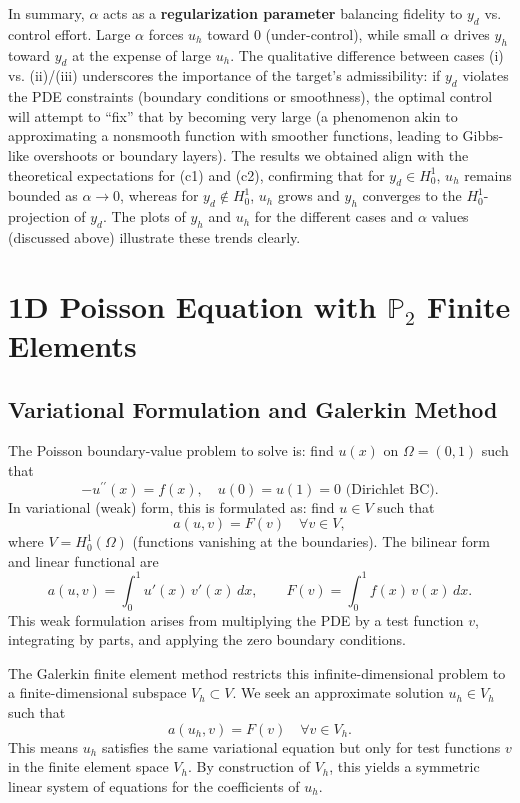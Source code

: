 \documentclass[a4paper,10pt]{report}
\begin{document}
In summary, \(\alpha\) acts as a \textbf{regularization parameter} balancing fidelity to \(y_d\) vs. control effort.
Large \(\alpha\) forces \(u_h\) toward 0 (under-control), while small \(\alpha\) drives \(y_h\) toward \(y_d\) at the expense of large \(u_h\). The qualitative difference between cases (i) vs. (ii)/(iii) underscores the importance of the target's admissibility: if \(y_d\) violates the PDE constraints (boundary conditions or smoothness), the optimal control will attempt to “fix” that by becoming very large (a phenomenon akin to approximating a nonsmooth function with smoother functions, leading to Gibbs-like overshoots or boundary layers). The results we obtained align with the theoretical expectations for (c1) and (c2), confirming that for \(y_d\in H^1_0\), \(u_h\) remains bounded as \(\alpha\to 0\), whereas for \(y_d\notin H^1_0\), \(u_h\) grows and \(y_h\) converges to the \(H^1_0\)-projection of \(y_d\).
The plots of \(y_h\) and \(u_h\) for the different cases and \(\alpha\) values (discussed above) illustrate these trends clearly.


\section[Quadratic FEM for Poisson]{1D Poisson Equation with \texorpdfstring{$\mathbb{P}_2$}{P2} Finite Elements}
\subsection{Variational Formulation and Galerkin Method}
The Poisson boundary-value problem to solve is: find \(u(x)\) on \(\Omega=(0,1)\) such that
\[
-u^{\prime\prime}(x) = f(x), \quad u(0)=u(1)=0 \text{ (Dirichlet BC)}.
\]
In variational (weak) form, this is formulated as: find \(u \in V\) such that
\[
a(u,v) = F(v) \quad \forall v \in V,
\]
where \(V = H^1_0(\Omega)\) (functions vanishing at the boundaries).
The bilinear form and linear functional are
\[
a(u,v) = \int_0^1 u'(x)\,v'(x)\,dx, \qquad F(v) = \int_0^1 f(x)\,v(x)\,dx.
\]
This weak formulation arises from multiplying the PDE by a test function \(v\), integrating by parts, and applying the zero boundary conditions.

The Galerkin finite element method restricts this infinite-dimensional problem to a finite-dimensional subspace \(V_h \subset V\). 
We seek an approximate solution \(u_h \in V_h\) such that
\[
a(u_h, v) = F(v) \quad \forall v \in V_h.
\]
This means \(u_h\) satisfies the same variational equation but only for test functions \(v\) in the finite element space \(V_h\). By construction of \(V_h\), this yields a symmetric linear system of equations for the coefficients of \(u_h\).
\end{document}
